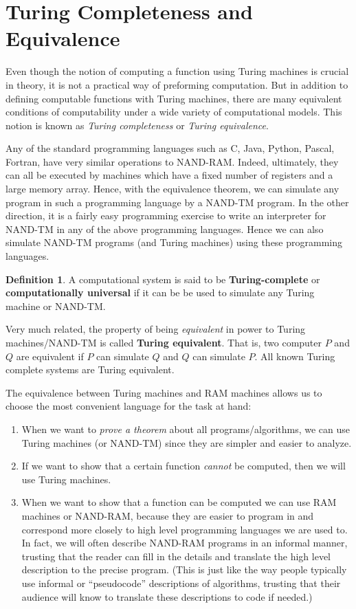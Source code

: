 \documentclass[a4paper, 12pt]{report}
\theoremstyle{remark}
\theoremstyle{definition}
\newtheorem{definition}{Definition}[section]
\begin{document}
\section{Turing Completeness and Equivalence}
Even though the notion of computing a function using Turing machines is crucial in theory, it is not a practical way of preforming computation. But in addition to defining computable functions with Turing machines, there are many equivalent conditions of computability under a wide variety of computational models. This notion is known as \textit{Turing completeness} or \textit{Turing equivalence}. 

Any of the standard programming languages such as C, Java, Python, Pascal, Fortran, have very similar operations to NAND-RAM. Indeed, ultimately, they can all be executed by machines which have a fixed number of registers and a large memory array. Hence, with the equivalence theorem, we can simulate any program in such a programming language by a NAND-TM program. In the other direction, it is a fairly easy programming exercise to write an interpreter for NAND-TM in any of the above programming languages. Hence we can also simulate NAND-TM programs (and Turing machines) using these programming languages. 

\begin{definition}
A computational system is said to be \textbf{Turing-complete} or \textbf{computationally universal} if it can be be used to simulate any Turing machine or NAND-TM. 

Very much related, the property of being \textit{equivalent} in power to Turing machines/NAND-TM is called \textbf{Turing equivalent}. That is, two computer $P$ and $Q$ are equivalent if $P$ can simulate $Q$ and $Q$ can simulate $P$. All known Turing complete systems are Turing equivalent. 
\end{definition}

The equivalence between Turing machines and RAM machines allows us to choose the most convenient language for the task at hand: 
\begin{enumerate}
    \item When we want to \textit{prove a theorem} about all programs/algorithms, we can use Turing machines (or NAND-TM) since they are simpler and easier to analyze. 
    \item If we want to show that a certain function \textit{cannot} be computed, then we will use Turing machines. 
    \item When we want to show that a function can be computed we can use RAM machines or NAND-RAM, because they are easier to program in and correspond more closely to high level programming languages we are used to. In fact, we will often describe NAND-RAM programs in an informal manner, trusting that the reader can fill in the details and translate the high level description to the precise program. (This is just like the way people typically use informal or “pseudocode” descriptions of algorithms, trusting that their audience will know to translate these descriptions to code if needed.)
\end{enumerate}
\end{document}
